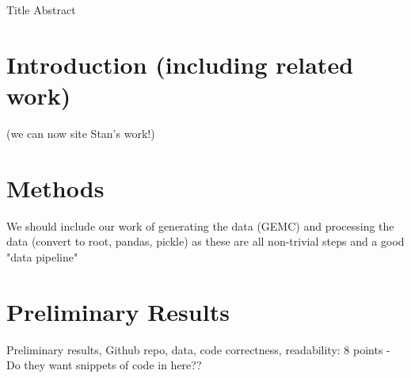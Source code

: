 
\iffalse
Guidelines from Canvas:
Due Monday 4.12 at 9 AM

Submit a 3 page + references milestone document (in pdf) on Canvas by Monday 4.12 at 9am, in the same format as the proposal.

Schedule a milestone meeting by 4.9 (times are allocated on FCFS basis).

Resubmit your milestone after the meeting on Canvas by Monday 4.16 at 9am.

Milestone report structure:
Title, Abstract
1. Introduction (including related work)
2. Methods
3. Results

Evaluation metrics for project milestone (20 points)
Introduction: 2 points
Related work and references: 2 points
Problem formulation, technical depth and innovation: 3 points
Methods, technical depth and innovation, architecture and design: 5 points
Preliminary results, Github repo, data, code correctness, readability: 8 points
\fi

Title
Abstract
\section{Introduction (including related work) }
(we can now site Stan's work!)
\section{Methods}
We should include our work of generating the data (GEMC) and processing the data (convert to root, pandas, pickle) as these are all non-trivial steps and a good "data pipeline"
\section{Preliminary Results}
Preliminary results, Github repo, data, code correctness, readability: 8 points - Do they want snippets of code in here??
